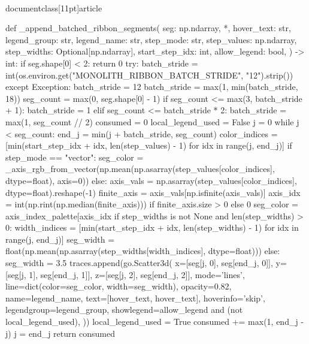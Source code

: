 \\documentclass[11pt]{article}
\begin{document}
\begin{CodeBlock}
{{    def _append_batched_ribbon_segments(
        seg: np.ndarray,
        *,
        hover_text: str,
        legend_group: str,
        legend_name: str,
        step_mode: str,
        step_values: np.ndarray,
        step_widths: Optional[np.ndarray],
        start_step_idx: int,
        allow_legend: bool,
    ) -> int:
        if seg.shape[0] < 2:
            return 0
        try:
            batch_stride = int(os.environ.get("MONOLITH_RIBBON_BATCH_STRIDE", "12").strip())
        except Exception:
            batch_stride = 12
        batch_stride = max(1, min(batch_stride, 18))
        seg_count = max(0, seg.shape[0] - 1)
        if seg_count <= max(3, batch_stride + 1):
            batch_stride = 1
        elif seg_count <= batch_stride * 2:
            batch_stride = max(1, seg_count // 2)
        consumed = 0
        local_legend_used = False
        j = 0
        while j < seg_count:
            end_j = min(j + batch_stride, seg_count)
            color_indices = [min(start_step_idx + idx, len(step_values) - 1) for idx in range(j, end_j)]
            if step_mode == "vector":
                seg_color = _axis_rgb_from_vector(np.mean(np.asarray(step_values[color_indices], dtype=float), axis=0))
            else:
                axis_vals = np.asarray(step_values[color_indices], dtype=float).reshape(-1)
                finite_axis = axis_vals[np.isfinite(axis_vals)]
                axis_idx = int(np.rint(np.median(finite_axis))) if finite_axis.size > 0 else 0
                seg_color = axis_index_palette[axis_idx %
            if step_widths is not None and len(step_widths) > 0:
                width_indices = [min(start_step_idx + idx, len(step_widths) - 1) for idx in range(j, end_j)]
                seg_width = float(np.mean(np.asarray(step_widths[width_indices], dtype=float)))
            else:
                seg_width = 3.5
            traces.append(go.Scatter3d(
                x=[seg[j, 0], seg[end_j, 0]],
                y=[seg[j, 1], seg[end_j, 1]],
                z=[seg[j, 2], seg[end_j, 2]],
                mode='lines',
                line=dict(color=seg_color, width=seg_width),
                opacity=0.82,
                name=legend_name,
                text=[hover_text, hover_text],
                hoverinfo='skip',
                legendgroup=legend_group,
                showlegend=allow_legend and (not local_legend_used),
            ))
            local_legend_used = True
            consumed += max(1, end_j - j)
            j = end_j
        return consumed

}}
\end{CodeBlock}
\end{document}
